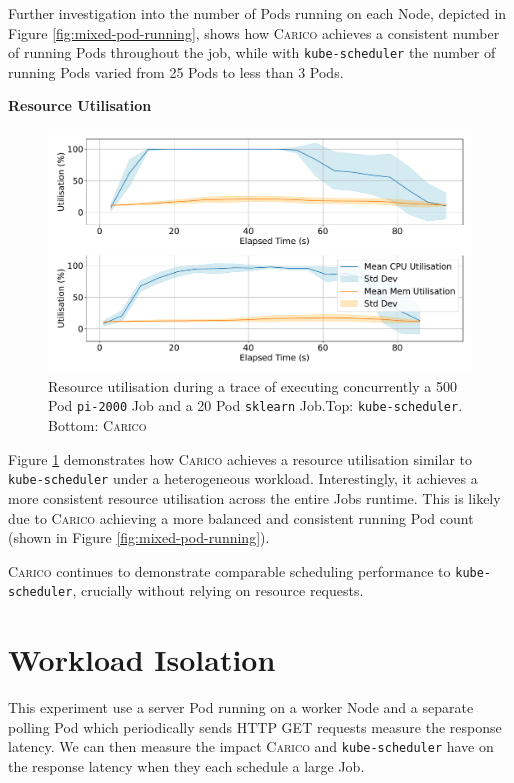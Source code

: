 Further investigation into the number of Pods running on each Node, depicted in
Figure \ref{fig:mixed-pod-running}, shows how \textsc{Carico} achieves a
consistent number of running Pods throughout the job, while with
\texttt{kube-scheduler} the number of running Pods varied from 25 Pods to less
than 3 Pods.

\textbf{Resource Utilisation}\\
\begin{figure}[ht!]
    \centering
    \includegraphics[width=\textwidth]{images/mixed-util.pdf}
    \caption{Resource utilisation during a trace of executing concurrently a 500
    Pod \texttt{pi-2000} Job and a 20 Pod \texttt{sklearn} Job.Top:
    \texttt{kube-scheduler}. Bottom: \textsc{Carico}}
    \label{fig:mixed-util}
\end{figure}

Figure \ref{fig:mixed-util} demonstrates how \textsc{Carico} achieves a resource
utilisation similar to \texttt{kube-scheduler} under a heterogeneous workload.
Interestingly, it achieves a more consistent resource utilisation across the
entire Jobs runtime. This is likely due to \textsc{Carico} achieving a more
balanced and consistent running Pod count (shown in Figure
\ref{fig:mixed-pod-running}).

\textsc{Carico} continues to demonstrate comparable scheduling performance to
\texttt{kube-scheduler}, crucially without relying on resource requests.

\section{Workload Isolation}
\label{sec:eval-isolation}
This experiment use a server Pod running on a worker Node and a separate polling
Pod which periodically sends HTTP GET requests measure the response latency. We
can then measure the impact \textsc{Carico} and \texttt{kube-scheduler} have on
the response latency when they each schedule a large Job.

